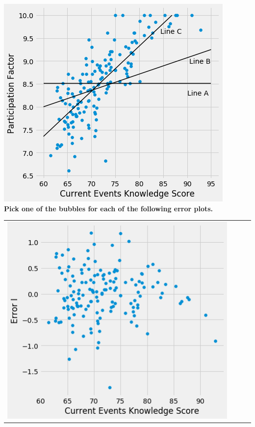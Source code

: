 \begin{enumerate}
\begin{center}
    \includegraphics[scale=.42]{figures/regression_lines.png}
    \\[8pt]
    \textbf{Pick one of the bubbles for each of the following error plots.}
\end{center}
\vskip 0.1in
\begin{tabular}{l@{\hskip 0.8in}l@{\hskip 0.1in}l@{\hskip 0.1in}l}
\includegraphics[scale=.41]{figures/residuals.png}

\end{tabular}
\end{enumerate}
